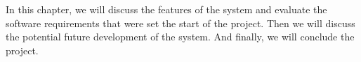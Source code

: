 In this chapter, we will discuss the features of the system and evaluate the software requirements that were set the
start of the project.
Then we will discuss the potential future development of the system.
And finally, we will conclude the project.
\pagebreak


\pagebreak

